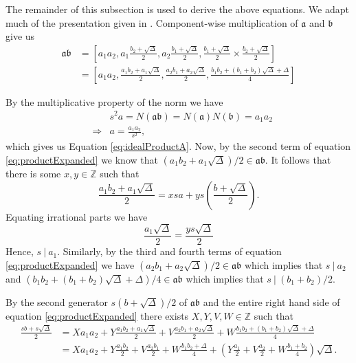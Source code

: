\documentclass{ucalgthes1}
\theoremstyle{definition}
\newcommand{\ZZ}{\mathbb{Z}}
\begin{document}
The remainder of this subsection is used to derive the above equations.  We adapt much of the presentation given in \cite[pp.117,118]{Jacobson2009}. Component-wise multiplication of $\mathfrak a$ and $\mathfrak b$ give us
\begin{equation}
\begin{split}
	\mathfrak{a} \mathfrak{b} & = \left[ a_1a_2, a_1 \frac{b_2 + \sqrt{\Delta}}{2}, a_2 \frac{b_1 + \sqrt{\Delta}}{2}, \frac{b_1 + \sqrt{\Delta}}{2} \times \frac{b_2 + \sqrt{\Delta}}{2} \right] \\
	& = \left[ a_1a_2, \frac{a_1b_2 + a_1\sqrt{\Delta}}{2}, \frac{a_2b_1 + a_2\sqrt{\Delta}}{2}, \frac{b_1b_2 + (b_1+b_2)\sqrt{\Delta} + \Delta}{4} \right] \label{eq:productExpanded}
\end{split}
\end{equation}

\noindent
By the multiplicative property of the norm we have
\begin{eqnarray*}
	&& s^2a = N(\mathfrak{a}\mathfrak{b}) = N(\mathfrak{a})N(\mathfrak{b}) = a_1 a_2 \\
	& \Rightarrow & a = \frac{a_1a_2}{s^2},
\end{eqnarray*}
which gives us Equation \ref{eq:idealProductA}. Now, by the second term of equation \eqref{eq:productExpanded} we know that $(a_1b_2 + a_1\sqrt{\Delta})/2 \in \mathfrak{a}\mathfrak{b}$.  It follows that there is some $x,y \in \ZZ$ such that
\[
	\frac{a_1b_2 + a_1\sqrt{\Delta}}{2} = xsa + ys\left(\frac{b+\sqrt{\Delta}}{2}\right).
\]
Equating irrational parts we have
\begin{equation*}
	\frac{a_1\sqrt{\Delta}}{2} = \frac{ys\sqrt{\Delta}}{2}
\end{equation*}
\noindent
Hence, $s ~|~ a_1$.  Similarly, by the third and fourth terms of equation \eqref{eq:productExpanded} we have $(a_2b_1+a_2\sqrt{\Delta})/2 \in \mathfrak{a}\mathfrak{b}$ which implies that $s~|~a_2$ and $(b_1b_2 + (b_1+b_2)\sqrt{\Delta} + \Delta)/4 \in \mathfrak{a}\mathfrak{b}$ which implies that $s~|~(b_1+b_2)/2$. 

By the second generator $s(b+\sqrt\Delta)/2$ of $\mathfrak{a}\mathfrak{b}$ and the entire right hand side of equation \eqref{eq:productExpanded} there exists $X, Y, V, W \in \ZZ$ such that
\begin{equation}
\label{eq:productSecond}
\begin{split}
	\frac{sb+s\sqrt\Delta}{2} & = Xa_1a_2 + Y\frac{a_1b_2+a_1\sqrt\Delta}{2} + V\frac{a_2b_1 + a_2\sqrt{\Delta}}{2} + W\frac{b_1b_2 + (b_1+b_2)\sqrt{\Delta} + \Delta}{4} \\
	& = Xa_1a_2 + Y\frac{a_1b_2}{2} + V\frac{a_2b_1}{2} + W\frac{b_1b_2 + \Delta}{4} + \left(Y\frac{a_1}{2} + V\frac{a_2}{2} + W\frac{b_1+b_2}{4}\right)\sqrt\Delta. 
\end{split}
\end{equation}
\end{document}

